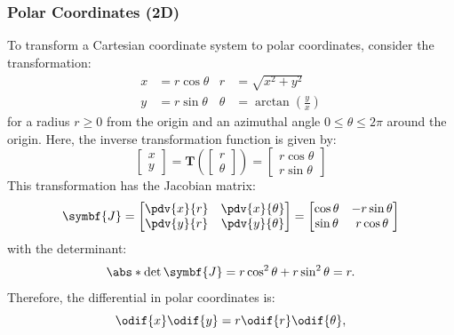 \documentclass{article}
\begin{document}
\subsubsection{Polar Coordinates (2D)}
To transform a Cartesian coordinate system to polar coordinates,
consider the transformation:
\begin{align*}
    x & = r \cos{\theta} & r      & = \sqrt{x^2 + y^2}                    \\
    y & = r \sin{\theta} & \theta & = \arctan{\left( \frac{y}{x} \right)}
\end{align*}
for a radius \(r \geqslant 0\) from the origin and an azimuthal angle
\(0 \leqslant \theta \leqslant 2\pi\) around the origin. Here, the
inverse transformation function is given by:
\begin{equation*}
    \begin{bmatrix}
        x \\
        y
    \end{bmatrix}
    = \symbf{T}\left(
    \begin{bmatrix}
        r \\
        \theta
    \end{bmatrix}
    \right) =
    \begin{bmatrix}
        r \cos{\theta} \\
        r \sin{\theta}
    \end{bmatrix}
\end{equation*}
This transformation has the Jacobian matrix:
\begin{equation*}
    \symbf{J} =
    \begin{bmatrix}
        \displaystyle\pdv{x}{r} & \displaystyle\pdv{x}{\theta} \\
        \displaystyle\pdv{y}{r} & \displaystyle\pdv{y}{\theta}
    \end{bmatrix}
    =
    \begin{bmatrix}
        \cos{\theta} & -r \sin{\theta} \\
        \sin{\theta} & r \cos{\theta}
    \end{bmatrix}
\end{equation*}
with the determinant:
\begin{equation*}
    \abs*{\det{\symbf{J}}} = r \cos^2{\theta} + r \sin^2{\theta} = r.
\end{equation*}
Therefore, the differential in polar coordinates is:
\begin{equation*}
    \odif{x} \odif{y} = r \odif{r} \odif{\theta},
\end{equation*}
\end{document}
